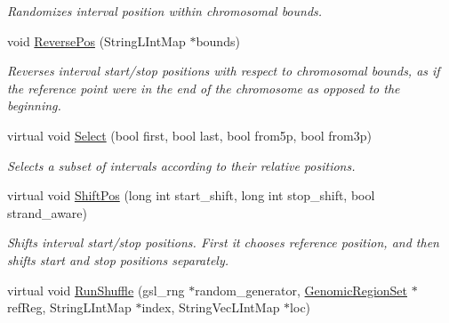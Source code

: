 \begin{CompactItemize}
\begin{CompactList}\small\item\em Randomizes interval position within chromosomal bounds. \item\end{CompactList}\item 
\hypertarget{classGenomicRegion_6120af435fb9ee68cb5a3d5066a4fda4}{
void \hyperlink{classGenomicRegion_6120af435fb9ee68cb5a3d5066a4fda4}{ReversePos} (StringLIntMap $\ast$bounds)}
\label{classGenomicRegion_6120af435fb9ee68cb5a3d5066a4fda4}

\begin{CompactList}\small\item\em Reverses interval start/stop positions with respect to chromosomal bounds, as if the reference point were in the end of the chromosome as opposed to the beginning. \item\end{CompactList}\item 
\hypertarget{classGenomicRegion_461fbb00db1b45061e641f37614fb146}{
virtual void \hyperlink{classGenomicRegion_461fbb00db1b45061e641f37614fb146}{Select} (bool first, bool last, bool from5p, bool from3p)}
\label{classGenomicRegion_461fbb00db1b45061e641f37614fb146}

\begin{CompactList}\small\item\em Selects a subset of intervals according to their relative positions. \item\end{CompactList}\item 
virtual void \hyperlink{classGenomicRegion_0ee8c165839c79afdc586f8b5e07788e}{ShiftPos} (long int start\_\-shift, long int stop\_\-shift, bool strand\_\-aware)
\begin{CompactList}\small\item\em Shifts interval start/stop positions. First it chooses reference position, and then shifts start and stop positions separately. \item\end{CompactList}\item 
\hypertarget{classGenomicRegion_b2c52ae40b34f3607f4558add94c25fd}{
virtual void \hyperlink{classGenomicRegion_b2c52ae40b34f3607f4558add94c25fd}{RunShuffle} (gsl\_\-rng $\ast$random\_\-generator, \hyperlink{classGenomicRegionSet}{GenomicRegionSet} $\ast$refReg, StringLIntMap $\ast$index, StringVecLIntMap $\ast$loc)}
\label{classGenomicRegion_b2c52ae40b34f3607f4558add94c25fd}


\end{CompactItemize}
